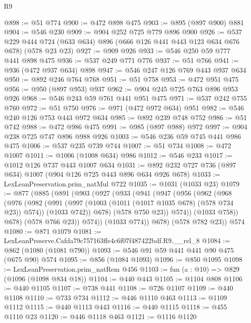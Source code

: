 \begin{lexlean}{R9}
\begin{coremodule}
@898 := @51 @774
@900 := @472 @898 @475
@903 := @895 (@897 @900) @881
@904 := @546 @230
@909 := @904 @252 @725 @779 @896 @900
@926 := @537
    @229
    @444
    @724
    (@633 @634)
    @896
    (@666 @126 @441 @443 @123 @634 @676 @678)
    (@578 @23 @23)
@927 := @909 @926
@933 := @546 @250 @59 @777 @441 @898 @475
@936 := @537 @249 @771 @776
@937 := @51 @766
@941 := @936 (@472 @937 @634) @898
@947 := @546 @247 @126 @769 @443 @937 @634
@950 := @892 @246 @764 @768
@951 := @51 @758
@953 := @472 @951 @475
@956 := @950 (@897 @953) @937
@962 := @904 @245 @725 @763 @896 @953 @926
@968 := @546 @243 @59 @761 @441 @951 @475
@971 := @537 @242 @755 @760
@972 := @51 @750
@976 := @971 (@472 @972 @634) @951
@982 := @546 @240 @126 @753 @443 @972 @634
@985 := @892 @239 @748 @752
@986 := @51 @742
@988 := @472 @986 @475
@991 := @985 (@897 @988) @972
@997 := @904 @238 @725 @747 @896 @988 @926
@1003 := @546 @236 @59 @745 @441 @986 @475
@1006 := @537 @235 @739 @744
@1007 := @51 @734
@1008 := @472 @1007
@1011 := @1006 (@1008 @634) @986
@1012 := @546 @233
@1017 := @1012 @126 @737 @443 @1007 @634
@1031 := @892 @232 @727 @736 (@897 @634) @1007 (@904 @126 @725 @443 @896 @634 @926 @678)
@1033 := LexLeanPreservation.prim_natMul @722
@1035 := @1031 (@1033 @23)
@1079 := @877
    (@885
      (@891
        (@903
          (@927
            (@933
              (@941
                (@947
                  (@956
                    (@962
                      (@968
                        (@976
                          (@982
                            (@991
                              (@997 (@1003 (@1011 (@1017 @1035 @678) (@578 @734 @23)) @574))
                              (@1033 @742))
                            @678)
                          (@578 @750 @23))
                        @574))
                    (@1033 @758))
                  @678)
                (@578 @766 @23))
              @574))
          (@1033 @774))
        @678)
      (@578 @782 @23))
    @574
@1080 := @871 @1079
@1081 := LexLeanPreserve.Cafda79c757163ffe4c6f07f487422bdf.R9.__rel_8
@1084 := @862 (@1080 (@1081 @790))
@1093 := @546 @91 @59 @441 @441 @90 @475 (@675 @90) @574
@1095 := @856 (@1084 @1093)
@1096 := @850 @1095
@1098 := LexLeanPreservation.prim_natRem @456
@1103 := fun (a : @10) => @829 (@1096 (@1098 @834 @18))
@1104 := @440 @443
@1105 := @1104 @808
@1106 := @440 @1105
@1107 := @738 @441
@1108 := @726 @1107
@1109 := @440 @1108
@1110 := @733 @734
@1112 := @446 @1110 @463
@1113 := @1109 @1112
@1115 := @440 @1113 @443
@1116 := @440 @1115
@1118 := @455 @1110 @23
@1120 := @446 @1118 @463
@1121 := @1116 @1120

\end{coremodule}
\end{lexlean}

